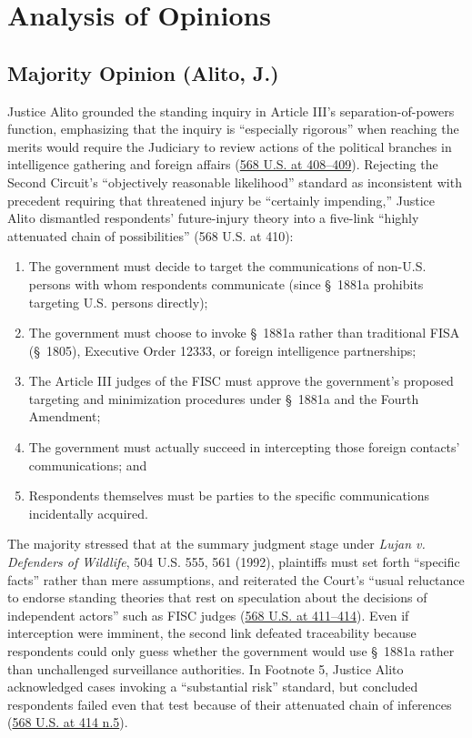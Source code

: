 \documentclass[12pt]{article}
\begin{document}
\section{Analysis of Opinions}

\subsection{Majority Opinion (Alito, J.)}

Justice Alito grounded the standing inquiry in Article III's separation-of-powers function, emphasizing that the inquiry is ``especially rigorous'' when reaching the merits would require the Judiciary to review actions of the political branches in intelligence gathering and foreign affairs (\href{https://tile.loc.gov/storage-services/service/ll/usrep/usrep568/usrep568398/usrep568398.pdf}{568 U.S. at 408--409}). Rejecting the Second Circuit's ``objectively reasonable likelihood'' standard as inconsistent with precedent requiring that threatened injury be ``certainly impending,'' Justice Alito dismantled respondents' future-injury theory into a five-link ``highly attenuated chain of possibilities'' (568 U.S. at 410):
\begin{enumerate}
    \item The government must decide to target the communications of non-U.S. persons with whom respondents communicate (since \S~1881a prohibits targeting U.S. persons directly);
    \item The government must choose to invoke \S~1881a rather than traditional FISA (\S~1805), Executive Order 12333, or foreign intelligence partnerships;
    \item The Article III judges of the FISC must approve the government's proposed targeting and minimization procedures under \S~1881a and the Fourth Amendment;
    \item The government must actually succeed in intercepting those foreign contacts' communications; and
    \item Respondents themselves must be parties to the specific communications incidentally acquired.
\end{enumerate}

The majority stressed that at the summary judgment stage under \textit{Lujan v. Defenders of Wildlife}, 504 U.S. 555, 561 (1992), plaintiffs must set forth ``specific facts'' rather than mere assumptions, and reiterated the Court's ``usual reluctance to endorse standing theories that rest on speculation about the decisions of independent actors'' such as FISC judges (\href{https://supreme.justia.com/cases/federal/us/568/398/}{568 U.S. at 411--414}). Even if interception were imminent, the second link defeated traceability because respondents could only guess whether the government would use \S~1881a rather than unchallenged surveillance authorities. In Footnote 5, Justice Alito acknowledged cases invoking a ``substantial risk'' standard, but concluded respondents failed even that test because of their attenuated chain of inferences (\href{https://www.scotusblog.com/2014/06/commentary-susan-b-anthony-list-clapper-footnote-5-and-the-state-of-article-iii-standing-doctrine/}{568 U.S. at 414 n.5}).
\end{document}
